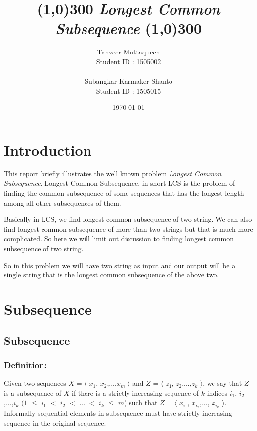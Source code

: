 \documentclass{report}
\title{
    \line(1,0){300}
    \endgraf\bigskip
    \Huge
    \emph{Longest Common Subsequence}
    \newline
    \line(1,0){300}
    \bigskip
    \bigskip
    }
\author{
    \Large{Tanveer Muttaqueen}\\
    \Large{Student ID : 1505002}\\\\
    \Large{Subangkar Karmaker Shanto}\\
    \Large{Student ID : 1505015}
    }
\date{
    \endgraf\bigskip
    \Large{\today}
    }
\begin{document}
    
    \maketitle
    \renewcommand{\familydefault}{\sfdefault}
    
    \tableofcontents
    
    \chapter{Introduction}
    This report briefly illustrates the well known problem \textit{Longest Common Subsequence}. Longest Common Subsequence, in short LCS is the problem of finding the common subsequence of some sequences that has the longest length among all other subsequences of them.
    
    \bigskip
    Basically in LCS, we find longest common subsequence of two string. We can also find longest common subsequence of more than two strings but that is much more complicated. So here we will limit out discussion to finding longest common subsequence of two string.
    
    \bigskip
    So in this problem we will have two string as input and our output will be a single string that is the longest common subsequence of the above two.  
    \newpage
    
    
    \chapter{Subsequence}
    \section{Subsequence}{
    \bigskip
    \subsection{Definition:}
    Given two sequences $X$ = $\langle$ $x_1$, $x_2$,...,$x_m$ $\rangle$ and $Z$  = $\langle$ $z_1$, $z_2$,...,$z_k$ $\rangle$, we say that $Z$ is a subsequence of $X$ if there is a strictly increasing sequence of $k$ indices $i_1$, $i_2$,...,$i_k$  $(1$ $\leq$ $i_1$ $<$ $i_2$ $<$ ... $<$ $i_k$ $\leq$ $m$) such that $Z$ = $\langle$ $x_{i_1}$, $x_{i_2}$,..., $x_{i_k}$ $\rangle$.\\
    
    Informally sequential elements in subsequence must have strictly increasing sequence in the original sequence.
    \bigskip
    }
    
\end{document}
